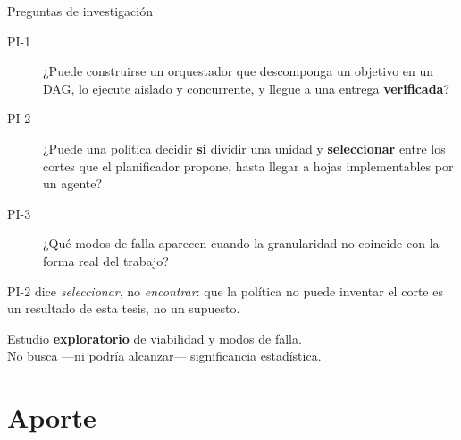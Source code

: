 \documentclass[10pt,aspectratio=169]{beamer}
\begin{document}
\begin{frame}{Preguntas de investigación}
  \begin{description}
    \item[PI-1] ¿Puede construirse un orquestador que descomponga un objetivo en
      un DAG, lo ejecute aislado y concurrente, y llegue a una entrega
      \textbf{verificada}?
    \item[PI-2] ¿Puede una política decidir \textbf{si} dividir una unidad y
      \textbf{seleccionar} entre los cortes que el planificador propone, hasta
      llegar a hojas implementables por un agente?
    \item[PI-3] ¿Qué modos de falla aparecen cuando la granularidad no coincide
      con la forma real del trabajo?
  \end{description}

  \bigskip
  \pause
  \small
  PI-2 dice \emph{seleccionar}, no \emph{encontrar}: que la política no puede
  inventar el corte es un resultado de esta tesis, no un supuesto.

  \bigskip
  \begin{center}
    \small Estudio \textbf{exploratorio} de viabilidad y modos de falla.\\
    No busca —ni podría alcanzar— significancia estadística.
  \end{center}
\end{frame}

\section{Aporte}
\end{document}
